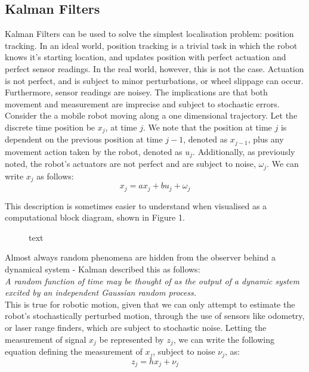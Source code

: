 \documentclass[a4paper]{article}
\begin{document}
\subsection{Kalman Filters}
Kalman Filters can be used to solve the simplest localisation problem: position tracking. In an ideal world, position tracking is a trivial task in which the robot knows it's starting location, and updates position with perfect actuation and perfect sensor readings. In the real world, however, this is not the case. Actuation is not perfect, and is subject to minor perturbations, or wheel slippage can occur. Furthermore, sensor readings are noisey. The implications are that both movement and measurement are imprecise and subject to stochastic errors. Consider the a mobile robot moving along a one dimensional trajectory. Let the discrete time position be $x_j$, at time $j$. We note that the position at time $j$ is dependent on the previous position at time $j-1$, denoted as $x_{j-1}$, plus any movement action taken by the robot, denoted as $u_j$. Additionally, as previously noted, the robot's actuators are not perfect and are subject to noise, $\omega_j$. We can write $x_j$ as follows:
\begin{equation}
x_j = a x_j + b u_j + \omega_j
\end{equation}

This description is sometimes easier to understand when visualised as a computational block diagram, shown in Figure 1.
\begin{figure}[h]
\centering

\caption{text}
\end{figure}

Almost always random phenomena are hidden from the observer behind a dynamical system - Kalman described this as follows:\\

\textit{A random function of time may be thought of as the output of a dynamic system excited by an independent Gaussian random process.} \cite{Kalman:1960}\\

This is true for robotic motion, given that we can only attempt to estimate the robot's stochastically perturbed motion, through the use of sensors like odometry, or laser range finders, which are subject to stochastic noise. Letting the measurement of signal $x_j$ be represented by $z_j$, we can write the following equation defining the measurement of $x_j$, subject to noise $\nu_j$, as:
\begin{equation}
z_j = h x_j + \nu_j
\end{equation} 
\end{document}
